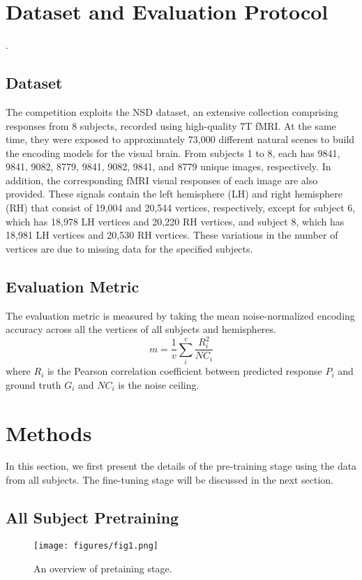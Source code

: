 \documentclass{article}
\begin{document}
\section{Dataset and Evaluation Protocol}. 
\subsection{Dataset}
The competition exploits the NSD dataset, an extensive collection comprising responses from 8 subjects, recorded using high-quality 7T fMRI. At the same time, they were exposed to approximately 73,000 different natural scenes to build the encoding models for the visual brain. From subjects 1 to 8, each has 9841, 9841, 9082, 8779, 9841, 9082, 9841, and 8779 unique images, respectively. In addition, the corresponding fMRI visual responses of each image are also provided. These signals contain the left hemisphere (LH) and right hemisphere (RH) that consist of 19,004 and 20,544 vertices, respectively, except for subject 6, which has 18,978 LH vertices and 20,220 RH vertices, and subject 8, which has 18,981 LH vertices and 20,530 RH vertices. These variations in the number of vertices are due to missing data for the specified subjects.

\subsection{Evaluation Metric} 
The evaluation metric is measured by taking the mean noise-normalized encoding accuracy across all the vertices of all subjects and hemispheres.
\begin{equation}
    m = \frac{1}{v} \sum_i^v \frac{R_i^2}{NC_i}
    \label{eq:metric}
\end{equation}
where $R_i$ is the Pearson correlation coefficient between predicted response $P_i$ and ground truth $G_i$ and $NC_i$ is the noise ceiling.

\section{Methods}
In this section, we first present the details of the pre-training stage using the data from all subjects. The fine-tuning stage will be discussed in the next section.

\subsection{All Subject Pretraining}

\begin{figure}[ht]
    \centering
    \texttt{[image: figures/fig1.png]}
    \caption{An overview of pretaining stage.}
    \label{fig:pretraining}
\end{figure}
\end{document}
